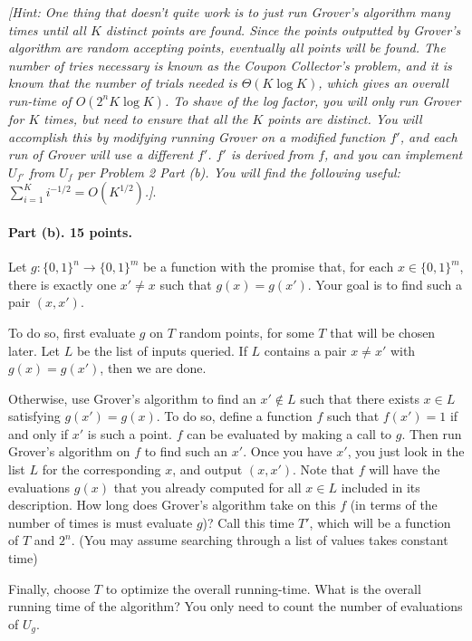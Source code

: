 \documentclass{article}
\begin{document}
\emph{[Hint: One thing that doesn't quite work is to just run Grover's algorithm many times until all $K$ distinct points are found. Since the points outputted by Grover's algorithm are random accepting points, eventually all points will be found. The number of tries necessary is known as the Coupon Collector's problem, and it is known that the number of trials needed is $\Theta(K\log K)$, which gives an overall run-time of $O(2^n K\log K)$. To shave of the log factor, you will only run Grover for $K$ times, but need to ensure that all the $K$ points are distinct. You will accomplish this by modifying running Grover on a modified function $f'$, and each run of Grover will use a different $f'$. $f'$ is derived from $f$, and you can implement $U_{f'}$ from $U_f$ per Problem 2 Part (b). You will find the following useful: $\sum_{i=1}^K i^{-1/2}=O(K^{1/2})$.]}.

\paragraph{Part (b). 15 points.} Let $g:\{0,1\}^n\rightarrow\{0,1\}^m$ be a function with the promise that, for each $x\in\{0,1\}^m$, there is exactly one $x'\neq x$ such that $g(x)=g(x')$. Your goal is to find such a pair $(x,x')$.

To do so, first evaluate $g$ on $T$ random points, for some $T$ that will be chosen later. Let $L$ be the list of inputs queried. If $L$ contains a pair $x\neq x'$ with $g(x)=g(x')$, then we are done.

Otherwise, use Grover's algorithm to find an $x'\notin L$ such that there exists $x\in L$ satisfying $g(x')=g(x)$. To do so, define a function $f$ such that $f(x')=1$ if and only if $x'$ is such a point. $f$ can be evaluated by making a call to $g$. Then run Grover's algorithm on $f$ to find such an $x'$. Once you have $x'$, you just look in the list $L$ for the corresponding $x$, and output $(x,x')$. Note that $f$ will have the evaluations $g(x)$ that you already computed for all $x\in L$ included in its description. How long does Grover's algorithm take on this $f$ (in terms of the number of times is must evaluate $g$)? Call this time $T'$, which will be a function of $T$ and $2^n$. (You may assume searching through a list of values takes constant time)

Finally, choose $T$ to optimize the overall running-time. What is the overall running time of the algorithm? You only need to count the number of evaluations of $U_g$.
\end{document}
